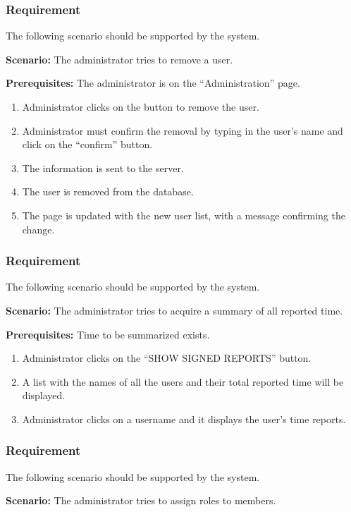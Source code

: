 \documentclass{article}
\begin{document}
\subsubsection{Requirement}
The following scenario should be supported by the system.

\textbf{Scenario:} The administrator tries to remove a user.

\textbf{Prerequisites:} The administrator is on the “Administration” page.

\begin{enumerate}
    \item Administrator clicks on the button to remove the user.
    \item Administrator must confirm the removal by typing in the user’s name and click on the “confirm” button.
    \item The information is sent to the server.
    \item The user is removed from the database.
    \item The page is updated with the new user list, with a message confirming the change.
\end{enumerate}


\subsubsection{Requirement}
The following scenario should be supported by the system.

\textbf{Scenario:} The administrator tries to acquire a summary of all reported time.

\textbf{Prerequisites:} Time to be summarized exists.

\begin{enumerate}
    \item Administrator clicks on the “SHOW SIGNED REPORTS” button.
    \item A list with the names of all the users and their total reported time will be displayed.
    \item Administrator clicks on a username and it displays the user’s time reports.
\end{enumerate}

\subsubsection{Requirement}
The following scenario should be supported by the system.

\textbf{Scenario:} The administrator tries to assign roles to members.
\end{document}
